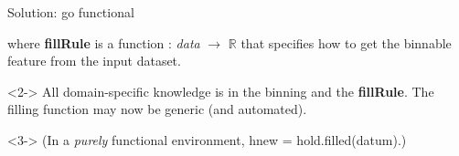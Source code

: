 \documentclass[aspectratio=169]{beamer}
\begin{document}
\begin{frame}[fragile]{Solution: go functional}
\vspace{0.5 cm}
\begin{center}
\end{center}

where {\ttfamily\small\textbf{fillRule}} is a function : {\it data} $\to$ $\mathbb{R}$ that specifies how to get the binnable feature from the input dataset.

\begin{uncoverenv}<2->
\vspace{0.5 cm}
All domain-specific knowledge is in the binning and the {\ttfamily\small\textbf{fillRule}}. The filling function may now be generic (and automated).

\begin{center}
\end{center}
\end{uncoverenv}

\begin{uncoverenv}<3->
\vspace{0.25 cm}
(In a {\it purely} functional environment, {\ttfamily\small hnew = hold.filled(datum)}.)
\end{uncoverenv}
\end{frame}
\end{document}
